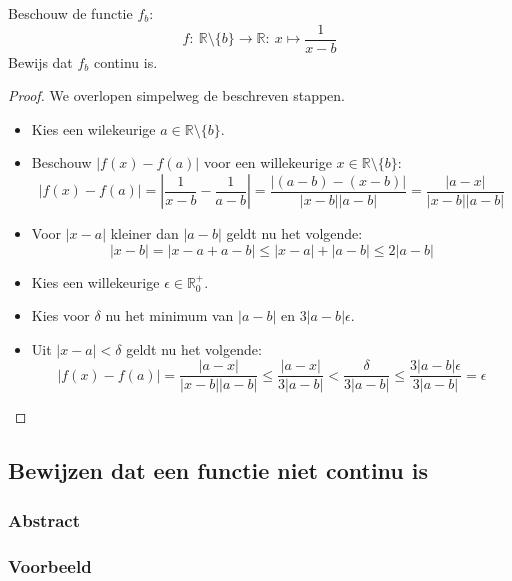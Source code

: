 \documentclass[main.tex]{subfiles}
\begin{document}
Beschouw de functie $f_{b}$:
\[ f:\ \mathbb{R}\setminus \{ b \} \rightarrow \mathbb{R}:\ x \mapsto \frac{1}{x-b} \]
Bewijs dat $f_{b}$ continu is.

\begin{proof}
  We overlopen simpelweg de beschreven stappen.
  \begin{itemize}
  \item Kies een wilekeurige $a \in \mathbb{R}\setminus \{ b \}$.
  \item Beschouw $|f(x)-f(a)|$ voor een willekeurige $x \in \mathbb{R}\setminus \{ b \}$:
    \[ |f(x)-f(a)| = \left|\frac{1}{x-b} - \frac{1}{a-b}\right| = \frac{|(a-b) - (x-b)|}{|x-b||a-b|} = \frac{|a-x|}{|x-b||a-b|} \]
  \item Voor $|x-a|$ kleiner dan $|a-b|$ geldt nu het volgende:
    \[ |x-b| = |x-a+a-b| \le |x-a|+|a-b| \le 2|a-b| \]
  \item Kies een willekeurige $\epsilon \in \mathbb{R}_{0}^{+}$.
  \item Kies voor $\delta$ nu het minimum van $|a-b|$ en $3|a-b|\epsilon$.
  \item Uit $|x-a| < \delta$ geldt nu het volgende:
    \[ |f(x)-f(a)| = \frac{|a-x|}{|x-b||a-b|} \le \frac{|a-x|}{3|a-b|} < \frac{\delta}{3|a-b|} \le \frac{3|a-b|\epsilon}{3|a-b|} = \epsilon \]
  \end{itemize}
\end{proof}
\feed

\subsection{Bewijzen dat een functie niet continu is}
\subsubsection{Abstract}
\subsubsection{Voorbeeld}
\end{document}
